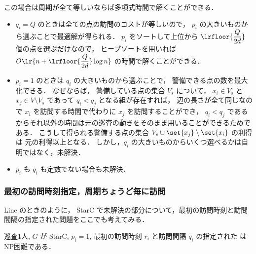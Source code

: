 この場合は周期が全て等しいならば多項式時間で解くことができる．

\begin{itemize}
\item 
$q_i = Q$ のときは全ての点の訪問のコストが等しいので，
$p_i$ の大きいものから選ぶことで最適解が得られる．
$p_i$ をソートして上位から $\lrfloor{\dfrac{Q}{2d}}$ 個の点を選ぶだけなので，
ヒープソートを用いれば $O\lr{n + \lrfloor{\dfrac{Q}{2d}} \log n}$ の時間で解くことができる．

\item 
$p_i = 1$ のときは $q_i$ の大きいものから選ぶことで，
警備できる点の数を最大化できる．
なぜならば，
警備している点の集合 $V_s$ について，
$x_i \in V_s$ と $x_j \in V \setminus V_s$ であって
$q_i < q_j$ となる組が存在すれば，
辺の長さが全て同じなので $x_i$ を訪問する時間で代わりに $x_j$ を訪問することができ，
$q_i < q_j$ であるからそれ以外の時間は元の巡査の動きをそのまま用いることができるためである．
こうして得られる警備する点の集合 $V_s \cup \set{ x_j} \setminus \set{ x_i }$ の利得は
元の利得以上となる．
しかし，$q_i$ の大きいものからいくつ選べるかは自明ではなく，未解決．

\item 
$p_i$ も $q_i$ も定数でない場合も未解決．
\end{itemize}




\subsubsection{最初の訪問時刻指定，周期ちょうど毎に訪問}

Line のときのように，
StarC で未解決の部分について，最初の訪問時刻と訪問間隔の指定された問題をここでも考えてみる．


\begin{theo}
	巡査1人, $G$ が StarC, $p_i = 1$, 
	最初の訪問時刻 $r_i$ と訪問間隔 $q_i$ の指定された \maxprofit はNP困難である．
\end{theo}


